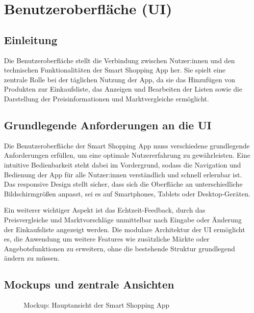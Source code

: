 \documentclass[12pt, a4paper]{report} %
\newcommand{\authorinitials}{} %
\begin{document}
\chapter{Benutzeroberfläche (UI)}
\renewcommand{\authorinitials}{NK}
\label{chap:ui}

\section{Einleitung}
Die Benutzeroberfläche stellt die Verbindung zwischen Nutzer:innen und den technischen Funktionalitäten der Smart Shopping App her. Sie spielt eine zentrale Rolle bei der täglichen Nutzung der App, da sie das Hinzufügen von Produkten zur Einkaufsliste, das Anzeigen und Bearbeiten der Listen sowie die Darstellung der Preisinformationen und Marktvergleiche ermöglicht.

\section{Grundlegende Anforderungen an die UI}
Die Benutzeroberfläche der Smart Shopping App muss verschiedene grundlegende Anforderungen erfüllen, um eine optimale Nutzererfahrung zu gewährleisten. Eine intuitive Bedienbarkeit steht dabei im Vordergrund, sodass die Navigation und Bedienung der App für alle Nutzer:innen verständlich und schnell erlernbar ist. Das responsive Design stellt sicher, dass sich die Oberfläche an unterschiedliche Bildschirmgrößen anpasst, sei es auf Smartphones, Tablets oder Desktop-Geräten.

Ein weiterer wichtiger Aspekt ist das Echtzeit-Feedback, durch das Preisvergleiche und Marktvorschläge unmittelbar nach Eingabe oder Änderung der Einkaufsliste angezeigt werden. Die modulare Architektur der UI ermöglicht es, die Anwendung um weitere Features wie zusätzliche Märkte oder Angebotsfunktionen zu erweitern, ohne die bestehende Struktur grundlegend ändern zu müssen.

\section{Mockups und zentrale Ansichten}
\begin{figure}[h!]
    \centering
    \caption{Mockup: Hauptansicht der Smart Shopping App}
    \label{fig:ui_mockup}
\end{figure}
\end{document}
